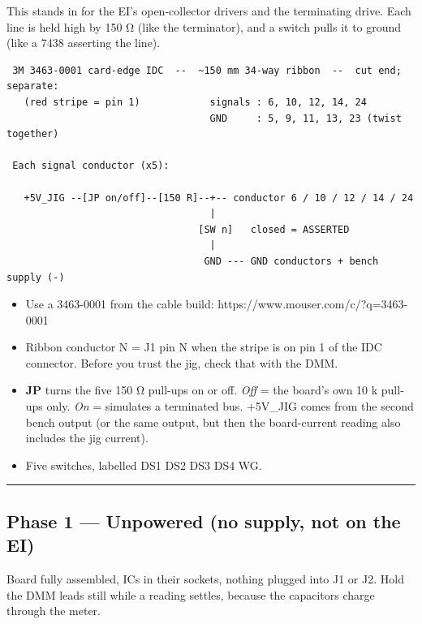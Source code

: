 \documentclass[
  10pt,
]{article}
\providecommand{\tightlist}{%
  \setlength{\itemsep}{0pt}\setlength{\parskip}{0pt}}
\begin{document}
This stands in for the EI's open-collector drivers and the
terminating drive. Each line is held high by 150 Ω (like the
terminator), and a switch pulls it to ground (like a 7438
asserting the line).

\begin{verbatim}
 3M 3463-0001 card-edge IDC  --  ~150 mm 34-way ribbon  --  cut end; separate:
   (red stripe = pin 1)            signals : 6, 10, 12, 14, 24
                                   GND     : 5, 9, 11, 13, 23 (twist together)

 Each signal conductor (x5):

   +5V_JIG --[JP on/off]--[150 R]--+-- conductor 6 / 10 / 12 / 14 / 24
                                   |
                                 [SW n]   closed = ASSERTED
                                   |
                                  GND --- GND conductors + bench supply (-)
\end{verbatim}

\begin{itemize}
\tightlist
\item
  Use a 3463-0001 from the cable build:
  https://www.mouser.com/c/?q=3463-0001
\item
  Ribbon conductor N = J1 pin N when the stripe is on pin 1
  of the IDC connector. Before you trust the jig, check that
  with the DMM.
\item
  \textbf{JP} turns the five 150 Ω pull-ups on or off.
  \emph{Off} = the board's own 10 k pull-ups only. \emph{On}
  = simulates a terminated bus. +5V\_JIG comes from the
  second bench output (or the same output, but then the
  board-current reading also includes the jig current).
\item
  Five switches, labelled DS1 DS2 DS3 DS4 WG.
\end{itemize}

\begin{center}\rule{0.5\linewidth}{0.5pt}\end{center}

\hypertarget{phase-1-unpowered-no-supply-not-on-the-ei}{%
\subsection{Phase 1 --- Unpowered (no supply, not on the
EI)}\label{phase-1-unpowered-no-supply-not-on-the-ei}}

Board fully assembled, ICs in their sockets, nothing plugged
into J1 or J2. Hold the DMM leads still while a reading
settles, because the capacitors charge through the meter.
\end{document}
